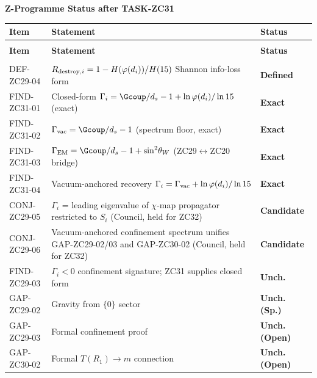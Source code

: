 \documentclass[12pt, a4paper]{article}
\begin{document}
{\small\color{crfgreen!20!black}\bfseries Z-Programme Status
after TASK-ZC31}
\vspace{2pt}

{\small
\setlength{\LTpre}{4pt}
\setlength{\LTpost}{4pt}
\renewcommand{\arraystretch}{1.30}
\begin{longtable}{>{\raggedright\arraybackslash}p{2.7cm}
                  >{\raggedright\arraybackslash}p{7.6cm}
                  >{\centering\arraybackslash}p{1.9cm}}
\toprule
\textbf{Item} & \textbf{Statement} & \textbf{Status}\\
\midrule
\endfirsthead
\multicolumn{3}{l}{\small\textit{(continued)}}\\[4pt]
\toprule
\textbf{Item} & \textbf{Statement} & \textbf{Status}\\
\midrule
\endhead
\midrule
\multicolumn{3}{r}{\small\textit{(continues)}}\\
\endfoot
\bottomrule
\endlastfoot
DEF-ZC29-04  & $R_{{\rm destroy},i} = 1 - H(\varphi(d_i))/H(15)$
  Shannon info-loss form & \textbf{Defined}\\
FIND-ZC31-01 & Closed-form $\Gamma_i = \Gcoup/d_s - 1
  + \ln\varphi(d_i)/\ln 15$ (exact)
  & \textbf{Exact}\\
FIND-ZC31-02 & $\Gamma_{\rm vac} = \Gcoup/d_s - 1$
  (spectrum floor, exact)
  & \textbf{Exact}\\
FIND-ZC31-03 & $\Gamma_{\rm EM} = \Gcoup/d_s - 1
  + \sin^2\!\theta_W$ (ZC29$\leftrightarrow$ZC20 bridge)
  & \textbf{Exact}\\
FIND-ZC31-04 & Vacuum-anchored recovery
  $\Gamma_i = \Gamma_{\rm vac} +
  \ln\varphi(d_i)/\ln 15$
  & \textbf{Exact}\\
\midrule
CONJ-ZC29-05 & $\Gamma_i$ = leading eigenvalue of $\chi$-map
  propagator restricted to $S_i$ (Council, held for ZC32)
  & \textbf{Candidate}\\
CONJ-ZC29-06 & Vacuum-anchored confinement spectrum unifies
  GAP-ZC29-02/03 and GAP-ZC30-02 (Council, held for ZC32)
  & \textbf{Candidate}\\
\midrule
FIND-ZC29-03 & $\Gamma_i < 0$ confinement signature; ZC31
  supplies closed form & \textbf{Unch.}\\
GAP-ZC29-02  & Gravity from $\{0\}$ sector
  & \textbf{Unch. (Sp.)}\\
GAP-ZC29-03  & Formal confinement proof
  & \textbf{Unch. (Open)}\\
GAP-ZC30-02  & Formal $T(R_1) \to m$ connection
  & \textbf{Unch. (Open)}\\
\end{longtable}
}
\vspace{-6pt}
\end{document}
